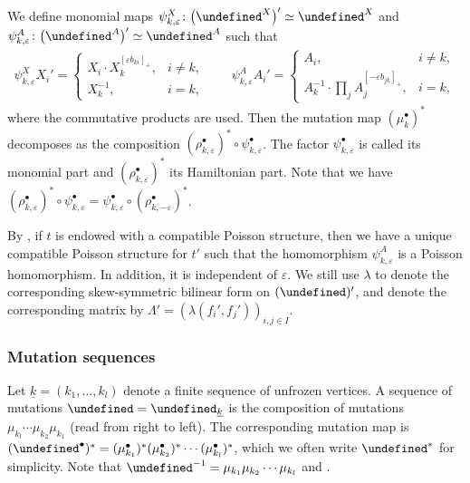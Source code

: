 \documentclass[10pt,a4paper]{amsart}
\newcommand{\uk}{{\underline{k}}}
\let\Mc\undefined
\let\LP\undefined
\let\seq\undefined
\newcommand{\Mc}{M^\circ}
\newcommand{\LP}{{\mathcal{LP}}}
\newcommand{\seq}{\boldsymbol{\mu}}%
\numberwithin{equation}{section}
\begin{document}
We define monomial maps $\psi_{k,\varepsilon}^{X}\colon\big(\LP^{X}\big)'\simeq\LP^{X}$
and $\psi_{k,\varepsilon}^{A}\colon\big(\LP^{A}\big)'\simeq\LP^{A}$ such that
\begin{gather*}
\psi_{k,\varepsilon}^{X}X_{i}' = \begin{cases}
X_{i}\cdot X_{k}^{[\varepsilon b_{ki}]_{+}}, & i\neq k,\\
X_{k}^{-1}, & i=k,
\end{cases}\qquad
\psi_{k,\varepsilon}^{A}A_{i}' = \begin{cases}
A_{i}, & i\neq k,\\
\displaystyle A_{k}^{-1}\cdot \prod_{j}A_{j}^{[-\varepsilon b_{jk}]_{+}}, & i=k,
\end{cases}
\end{gather*}
where the commutative products are used. Then the mutation map $(\mu_{k}^{\bullet})^{*}$ decomposes as the
composition $(\rho_{k,\varepsilon}^{\bullet})^{*}\circ\psi_{k,\varepsilon}^{\bullet}$.
The factor $\psi_{k,\varepsilon}^{\bullet}$ is called its monomial
part and $(\rho_{k,\varepsilon}^{\bullet})^{*}$ its Hamiltonian part. Note that
we have $(\rho_{k,\varepsilon}^{\bullet})^{*}\circ\psi_{k,\varepsilon}^{\bullet}=\psi_{k,\varepsilon}^{\bullet}\circ(\rho_{k,-\varepsilon}^{\bullet})^{*}$.

By \cite{BerensteinZelevinsky05}, if $t$ is endowed with a compatible Poisson structure, then we have a unique compatible Poisson structure for $t'$ such
that the homomorphism $\psi^{A}_{k,\varepsilon}$ is a Poisson homomorphism. In addition, it is independent of $\varepsilon$. We still use $\lambda$ to denote the corresponding skew-symmetric
bilinear form on $(\Mc)'$, and denote the corresponding matrix by
$\Lambda'=(\lambda(f_{i}',f_{j}'))_{i,j\in I}$.

\subsubsection*{Mutation sequences}
Let $\uk=(k_{1},\ldots,k_{l})$ denote a finite sequence of unfrozen vertices.
A sequence of mutations ${\seq=\seq_{\uk}}$ is the composition of mutations
$\mu_{k_{l}}\cdots\mu_{k_{2}}\mu_{k_{1}}$ (read from right to left).
The corresponding mutation map is $(\seq^{\bullet})^{*}=(\mu_{k_{1}}^{\bullet})^{*}(\mu_{k_{2}}^{\bullet})^{*}\cdots(\mu_{k_{l}}^{\bullet})^{*}$,
which we often write $\seq^{*}$ for simplicity. Note that $\seq^{-1}=\mu_{k_{1}}\mu_{k_{2}}\cdots \mu_{k_{l}}$ and \smash{$(\seq^*)^{-1}=\big(\seq^{-1}\big)^{*}$}.
\end{document}
